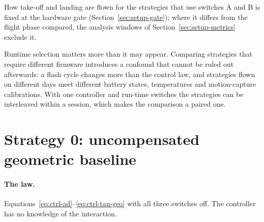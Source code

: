 How take-off and landing are flown for the strategies that use switches A and B is fixed at the
hardware gate (Section~\ref{sec:setup-gate}); where it differs from the flight phase compared, the
analysis windows of Section~\ref{sec:setup-metrics} exclude it.

Runtime selection matters more than it may appear. Comparing strategies that require different
firmware introduces a confound that cannot be ruled out afterwards: a flash cycle changes more
than the control law, and strategies flown on different days meet different battery states,
temperatures and motion-capture calibrations. With one controller and run-time switches the
strategies can be interleaved within a session, which makes the comparison a paired one.

\section{Strategy 0: uncompensated geometric baseline}
\label{sec:ctrl-s0}

\paragraph{The law.} Equations~\eqref{eq:ctrl-ad}--\eqref{eq:ctrl-tau-geo} with all three switches
off. The controller has no knowledge of the interaction.

